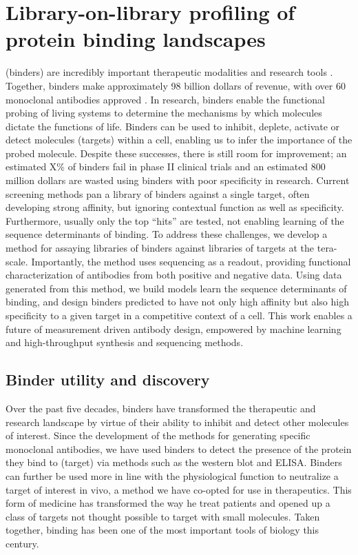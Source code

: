 \chapter{Library-on-library profiling of protein binding landscapes}


 (binders) are incredibly important therapeutic modalities and research tools \cite{Weiner2015-om}. Together, binders make approximately 98 billion dollars of revenue, with over 60 monoclonal antibodies approved \cite{Singh2018-pk,Ecker2015-jl}. In research, binders enable the functional probing of living systems to determine the mechanisms by which molecules dictate the functions of life. Binders can be used to inhibit, deplete, activate or detect molecules (targets) within a cell, enabling us to infer the importance of the probed molecule\cite{Rhodes2006-za}. Despite these successes, there is still room for improvement; an estimated X\% of binders fail in phase II clinical trials\cite{Ecker2015-jl} and an estimated 800 million dollars are wasted using binders with poor specificity in research\cite{Bradbury2015-hm}. Current screening methods pan a library of binders against a single target, often developing strong affinity, but ignoring contextual function as well as specificity. Furthermore, usually only the top “hits” are tested, not enabling learning of the sequence determinants of binding.  To address these challenges, we develop a method for assaying libraries of binders against libraries of targets at the tera-scale. Importantly, the method uses sequencing as a readout, providing functional characterization of antibodies from both positive and negative data. Using data generated from this method, we build models learn the sequence determinants of binding, and design binders predicted to have not only high affinity but also high specificity to a given target in a competitive context of a cell. This work enables a future of measurement driven antibody design, empowered by machine learning and high-throughput synthesis and sequencing methods.

\section{Binder utility and discovery} 

Over the past five decades, binders have transformed the therapeutic and research landscape by virtue of their ability to inhibit and detect other molecules of interest\cite{Kohler1975-oz}. Since the development of the methods for generating specific monoclonal antibodies\cite{Kohler1975-oz,Rossant2014-cf}, we have used binders to detect the presence of the protein they bind to (target) via methods such as the western blot and ELISA\cite{Engvall1971-ff,Burnette1981-nc}. Binders can further be used more in line with the physiological function to neutralize a target of interest in vivo, a method we have co-opted for use in therapeutics. This form of medicine has transformed the way he treat patients and opened up a class of targets not thought possible to target with small molecules. Taken together, binding has been one of the most important tools of biology this century. 

